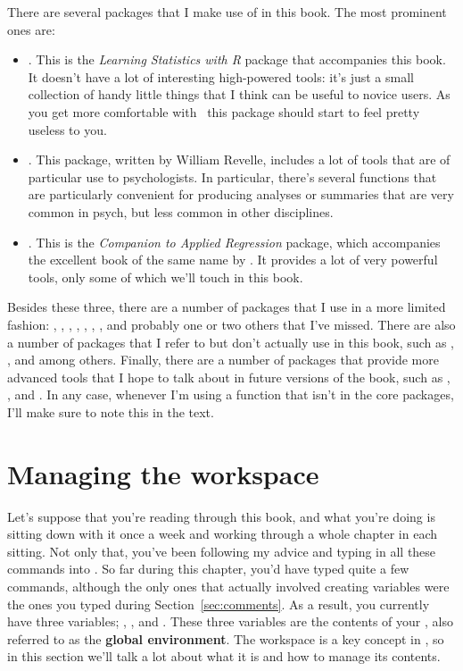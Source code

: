 

There are several packages that I make use of in this book. The most prominent ones are:

\begin{itemize}
\item {}. This is the {\it Learning Statistics with R} package that accompanies this book. It doesn't have a lot of interesting high-powered tools: it's just a small collection of handy little things that I think can be useful to novice users. As you get more comfortable with \R\ this package should start to feel pretty useless to you.
\item {}. This package, written by William Revelle, includes a lot of tools that are of particular use to psychologists. In particular, there's several functions that are particularly convenient for producing analyses or summaries that are very common in psych, but less common in other disciplines. 
\item {}. This is the {\it Companion to Applied Regression} package, which accompanies the excellent book of the same name by . It provides a lot of very powerful tools, only some of which we'll touch in this book.
\end{itemize}

\noindent 
Besides these three, there are a number of packages that I use in a more limited fashion: , , ,  , , , , and probably one or two others that I've missed. There are also a number of packages that I refer to but don't actually use in this book, such as , ,  and  among others. Finally, there are a number of packages that provide more advanced tools that I hope to talk about in future versions of the book, such as , ,  and . In any case, whenever I'm using a function that isn't in the core packages, I'll make sure to note this in the text.



\section{Managing the workspace\label{sec:workspace}}

Let's suppose that you're reading through this book, and what you're doing is sitting down with it once a week and working through a whole chapter in each sitting. Not only that, you've been following my advice and typing in all these commands into \R. So far during this chapter, you'd have typed quite a few commands, although the only ones that actually involved creating variables were the ones you typed during Section~\ref{sec:comments}. As a result, you currently have three variables; , , and . These three variables are the contents of your , also referred to as the \textbf{global environment}. The workspace is a key concept in \R, so in this section we'll talk a lot about what it is and how to manage its contents.



